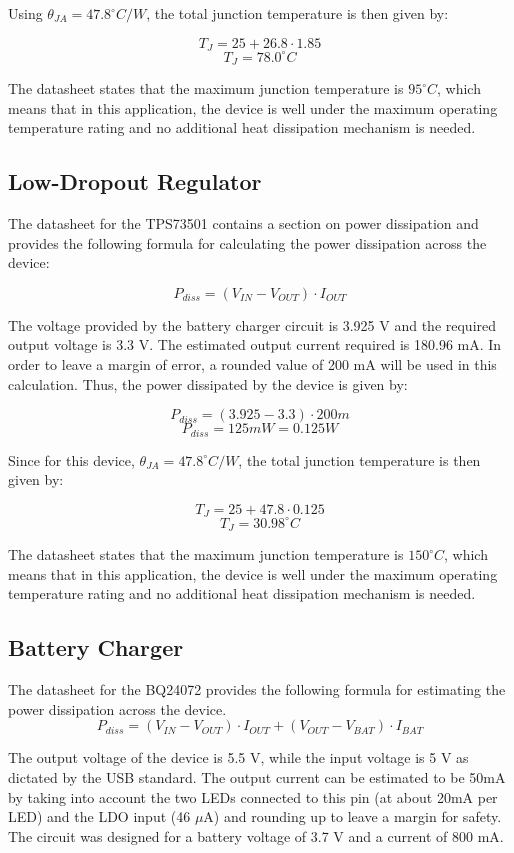 \documentclass[12pt,letterpaper]{article}
\begin{document}
Using $\theta_{JA} = 47.8^\circ C/W$, the total junction temperature is then given by:

\[T_J = 25 + 26.8 \cdot 1.85 \]
\[\boxed{T_J = 78.0 ^\circ C}\]

The datasheet states that the maximum junction temperature is $95^\circ C$, which means that in this application, the device is well under the maximum operating temperature rating and no additional heat dissipation mechanism is needed.


\subsection{Low-Dropout Regulator}
The datasheet for the TPS73501 contains a section on power dissipation and provides the following formula for calculating the power dissipation across the device:

\[P_{diss} = \left(V_{IN} - V_{OUT}\right)\cdot I_{OUT}\]

The voltage provided by the battery charger circuit is 3.925 V and the required output voltage is 3.3 V.  The estimated output current required is 180.96 mA.  In order to leave a margin of error, a rounded value of 200 mA will be used in this calculation.  Thus, the power dissipated by the device is given by:

\[P_{diss} = \left(3.925 - 3.3\right)\cdot 200m\]
\[\boxed{P_{diss} = 125mW = 0.125W}\]

Since for this device, $\theta_{JA} = 47.8^\circ C/W$, the total junction temperature is then given by:

\[T_J = 25 + 47.8 \cdot 0.125 \]
\[\boxed{T_J = 30.98 ^\circ C}\]

The datasheet states that the maximum junction temperature is $150^\circ C$, which means that in this application, the device is well under the maximum operating temperature rating and no additional heat dissipation mechanism is needed.


\subsection{Battery Charger}

The datasheet for the BQ24072 provides the following formula for estimating the power dissipation across the device.
\[P_{diss} = \left(V_{IN} - V_{OUT}\right)\cdot I_{OUT} + \left(V_{OUT} - V_{BAT}\right)\cdot I_{BAT}\]

The output voltage of the device is 5.5 V, while the input voltage is 5 V as dictated by the USB standard.  The output current can be estimated to be 50mA by taking into account the two LEDs connected to this pin (at about 20mA per LED) and the LDO input (46 $\mu$A) and rounding up to leave a margin for safety.  The circuit was designed for a battery voltage of 3.7 V and a current of 800 mA.
\end{document}
